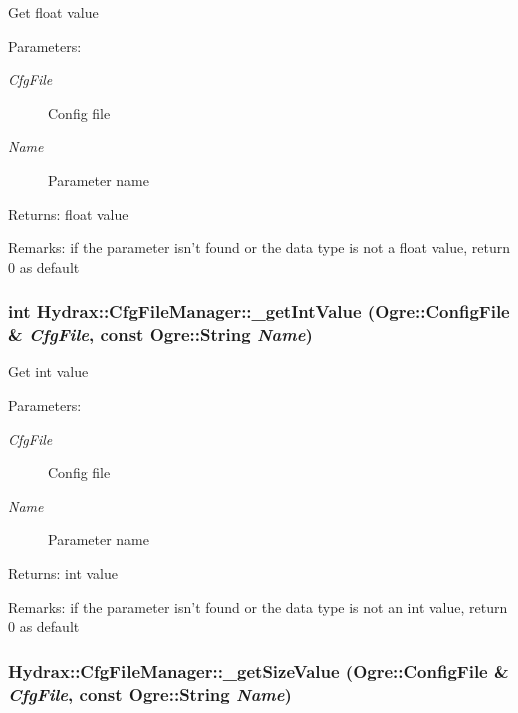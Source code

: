 Get float value \begin{Desc}
\item[Parameters:]
\begin{description}
\item[{\em CfgFile}]Config file \item[{\em Name}]Parameter name \end{description}
\end{Desc}
\begin{Desc}
\item[Returns:]float value \end{Desc}
\begin{Desc}
\item[Remarks:]if the parameter isn't found or the data type is not a float value, return 0 as default \end{Desc}
\hypertarget{class_hydrax_1_1_cfg_file_manager_f55d91d6fe191edaf32752db39bde7ee}{
\subsubsection[{\_\-getIntValue}]{\setlength{\rightskip}{0pt plus 5cm}int Hydrax::CfgFileManager::\_\-getIntValue (Ogre::ConfigFile \& {\em CfgFile}, \/  const Ogre::String {\em Name})}}
\label{class_hydrax_1_1_cfg_file_manager_f55d91d6fe191edaf32752db39bde7ee}


Get int value \begin{Desc}
\item[Parameters:]
\begin{description}
\item[{\em CfgFile}]Config file \item[{\em Name}]Parameter name \end{description}
\end{Desc}
\begin{Desc}
\item[Returns:]int value \end{Desc}
\begin{Desc}
\item[Remarks:]if the parameter isn't found or the data type is not an int value, return 0 as default \end{Desc}
\hypertarget{class_hydrax_1_1_cfg_file_manager_1d688a86347f04a920dafead01343a5b}{
\subsubsection[{\_\-getSizeValue}]{ Hydrax::CfgFileManager::\_\-getSizeValue (Ogre::ConfigFile \& {\em CfgFile}, \/  const Ogre::String {\em Name})}}
\label{class_hydrax_1_1_cfg_file_manager_1d688a86347f04a920dafead01343a5b}


